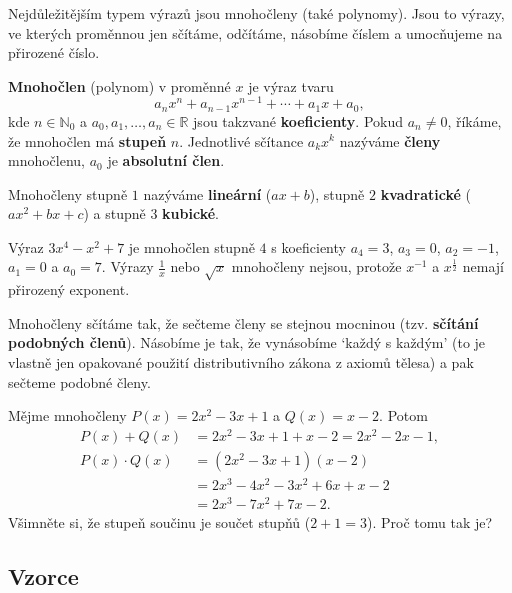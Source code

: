Nejdůležitějším typem výrazů jsou mnohočleny (také polynomy). Jsou to výrazy, ve kterých proměnnou jen sčítáme, odčítáme, násobíme číslem a umocňujeme na přirozené číslo.

\begin{definitionbox}
  \textbf{Mnohočlen} (polynom) v proměnné $x$ je výraz tvaru
  \begin{equation*}
    a_nx^n + a_{n-1}x^{n-1} + \cdots + a_1x + a_0,
  \end{equation*}
  kde $n\in\mathbb{N}_0$ a $a_0, a_1, \ldots, a_n\in\mathbb{R}$ jsou takzvané \textbf{koeficienty}. Pokud $a_n\neq 0$, říkáme, že mnohočlen má \textbf{stupeň} $n$. Jednotlivé sčítance $a_kx^k$ nazýváme \textbf{členy} mnohočlenu, $a_0$ je \textbf{absolutní člen}.

  \vspace{0.2cm}

  Mnohočleny stupně $1$ nazýváme \textbf{lineární} ($ax + b$), stupně $2$ \textbf{kvadratické} ($ax^2 + bx + c$) a stupně $3$ \textbf{kubické}.
\end{definitionbox}

\begin{example}
  Výraz $3x^4 - x^2 + 7$ je mnohočlen stupně $4$ s koeficienty $a_4 = 3$, $a_3 = 0$, $a_2 = -1$, $a_1 = 0$ a $a_0 = 7$. Výrazy $\frac{1}{x}$ nebo $\sqrt{x}$ mnohočleny nejsou, protože $x^{-1}$ a $x^{\frac{1}{2}}$ nemají přirozený exponent.
\end{example}

Mnohočleny sčítáme tak, že sečteme členy se stejnou mocninou (tzv. \textbf{sčítání podobných členů}). Násobíme je tak, že vynásobíme `každý s každým' (to je vlastně jen opakované použití distributivního zákona z axiomů tělesa) a pak sečteme podobné členy.

\begin{example}
  Mějme mnohočleny $P(x) = 2x^2 - 3x + 1$ a $Q(x) = x - 2$. Potom
  \begin{align*}
    P(x) + Q(x) &= 2x^2 - 3x + 1 + x - 2 = 2x^2 - 2x - 1,\\
    P(x)\cdot Q(x) &= (2x^2 - 3x + 1)(x - 2)\\
    &= 2x^3 - 4x^2 - 3x^2 + 6x + x - 2\\
    &= 2x^3 - 7x^2 + 7x - 2.
  \end{align*}
  Všimněte si, že stupeň součinu je součet stupňů ($2 + 1 = 3$). Proč tomu tak je?
\end{example}

\subsection{Vzorce}

